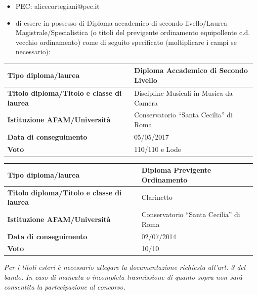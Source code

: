 \documentclass[a4paper,12pt]{article}
\begin{document}
\begin{flushleft}
\begin{itemize}[leftmargin=0.5cm, itemsep=0.3cm]
\item PEC: alicecortegiani@pec.it

\item di essere in possesso di Diploma accademico di secondo livello/Laurea Magistrale/Specialistica (o titoli del previgente ordinamento equipollente c.d. vecchio ordinamento) come di seguito specificato (moltiplicare i campi se necessario):

\end{itemize}

\begin{center}
\begin{tabularx}{\textwidth}{|X|X|}
\hline
\textbf{Tipo diploma/laurea} & Diploma Accademico di Secondo Livello\\[1cm]
\hline
\textbf{Titolo diploma/Titolo e classe di laurea} & Discipline Musicali in Musica da Camera\\[1cm]
\hline
\textbf{Istituzione AFAM/Università} & Conservatorio ``Santa Cecilia'' di Roma \\[1cm]
\hline
\textbf{Data di conseguimento} & 05/05/2017\\[1cm]
\hline
\textbf{Voto} & 110/110 e Lode\\[1cm]
\hline
\end{tabularx}
\end{center}

\begin{center}
\begin{tabularx}{\textwidth}{|X|X|}
\hline
\textbf{Tipo diploma/laurea} & Diploma Previgente Ordinamento\\[1cm]
\hline
\textbf{Titolo diploma/Titolo e classe di laurea} & Clarinetto\\[1cm]
\hline
\textbf{Istituzione AFAM/Università} & Conservatorio ``Santa Cecilia'' di Roma \\[1cm]
\hline
\textbf{Data di conseguimento} & 02/07/2014\\[1cm]
\hline
\textbf{Voto} & 10/10\\[1cm]
\hline
\end{tabularx}
\end{center}

\vspace{0.5cm}
\textit{Per i titoli esteri è necessario allegare la documentazione richiesta all'art. 3 del bando. In caso di mancata o incompleta trasmissione di quanto sopra non sarà consentita la partecipazione al concorso.}

\begin{itemize}[leftmargin=0.5cm, itemsep=0.3cm, resume]


\end{itemize}
\end{flushleft}
\end{document}
